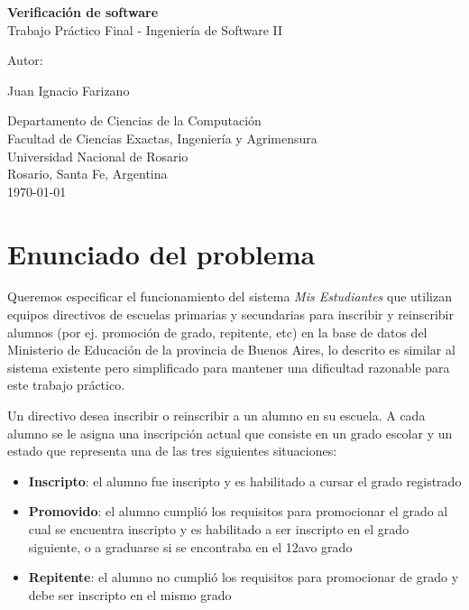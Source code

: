 \documentclass{article}
\begin{document}
\begin{titlepage}
  \thispagestyle{empty}
  \begin{center}
    
    {\huge \textbf{Verificación de software} \\[0.4cm]}
    {\large Trabajo Práctico Final - Ingeniería de Software II} \\
    \noindent
    
    \vfill
    \vfill
    \vfill
    {\Large Autor: \par}
    {\Large Juan Ignacio Farizano\par}
  
    \vfill
    Departamento de Ciencias de la Computaci\'on\\
    Facultad de Ciencias Exactas, Ingenier\'ia y Agrimensura\\
    Universidad Nacional de Rosario \\
    Rosario, Santa Fe, Argentina\\[0.4cm]
    {\large \today} 
  \end{center}
\end{titlepage}

\section{Enunciado del problema}
Queremos especificar el funcionamiento del sistema \emph{Mis Estudiantes} que utilizan equipos directivos de escuelas primarias y secundarias para inscribir y reinscribir alumnos (por ej. promoción de grado, repitente, etc) en la base de datos del Ministerio de Educación de la provincia de Buenos Aires, lo descrito es similar al sistema existente pero simplificado para mantener una dificultad razonable para este trabajo práctico.

Un directivo desea inscribir o reinscribir a un alumno en su escuela. A cada alumno se le asigna una inscripción actual que consiste en un grado escolar y un estado que representa una de las tres siguientes situaciones:

\begin{itemize}
  \item \textbf{Inscripto}: el alumno fue inscripto y es habilitado a cursar el grado registrado
  \item \textbf{Promovido}: el alumno cumplió los requisitos para promocionar el grado al cual se encuentra inscripto y es habilitado a ser inscripto en el grado siguiente, o a graduarse si se encontraba en el 12avo grado
  \item \textbf{Repitente}: el alumno no cumplió los requisitos para promocionar de grado y debe ser inscripto en el mismo grado
\end{itemize}
\end{document}
